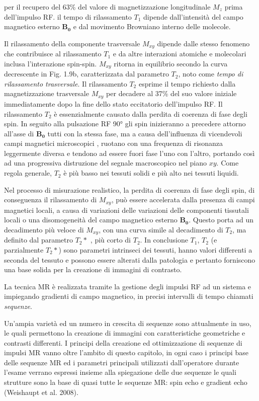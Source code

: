 \documentclass[leqno,10pt,twocolumn,a4paper]{article}
\begin{document}
	per il recupero del 63\% del valore di magnetizzazione longitudinale $M_z$ prima dell'impulso RF. il tempo di rilassamento $T_1$ dipende dall'intensità del campo magnetico esterno $\boldsymbol{B_0}$ e dal 
	movimento Browniano interno delle molecole. \par Il rilassamento della componente trasversale $M_{xy}$ dipende dalle stesso fenomeno che contribuisce al rilassamento $T_1$ e da altre interazioni atomiche e
	molecolari inclusa l'interazione spin-spin. $M_{xy}$ ritorna in equilibrio secondo la curva decrescente in Fig. 1.9b, caratterizzata dal parametro $T_2$, noto come \textit{tempo di rilassamento trasversale}.
	Il rilassamento $T_2$ esprime il tempo richiesto dalla magnetizzazione trasversale $M_{xy}$ per decadere al 37\% del suo valore iniziale immediatamente dopo la fine dello stato eccitatorio dell'impulso RF.
	Il rilassamento $T_2$ è essenzialmente causato dalla perdita di coerenza di fase degli spin. In seguito alla pulsazione RF 90° gli spin inizieranno a precedere attorno all'asse di $\boldsymbol{B_0}$ tutti con 
	la stessa fase, ma a causa dell'influenza di vicendevoli campi magnetici microscopici , ruotano con una frequenza di risonanza leggermente diversa e tendono ad essere fuori fase l'uno con l'altro, portando 
	così ad una progressiva distruzione del segnale macroscopico nel piano $xy$. Come regola generale, $T_2$ è più basso nei tessuti solidi e più alto nei tessuti liquidi. \par Nel processo di misurazione realistico,
	la perdita di coerenza di fase degli spin, di conseguenza il rilassamento di $M_{xy}$, può essere accelerata dalla presenza di campi magnetici locali, a causa di variazioni delle variazioni delle componenti tissutali
	locali o una disomogeneità del campo magnetico esterno $\boldsymbol{B_0}$. Questo porta ad un decadimento più veloce di $M_{xy}$, con una curva simile al decadimento di $T_2$, ma definito dal parametro
	$T_2*$%
	, più corto di $T_2$. In conclusione $T_1$, $T_2$ (e parzialmente $T_2*$) sono parametri intrinseci dei tessuti, hanno valori differenti a seconda del tessuto e possono essere alterati dalla patologia e pertanto
	forniscono una base solida per la creazione di immagini di contrasto. \par La tecnica MR è realizzata tramite la gestione degli impulsi RF ad un sistema e impiegando gradienti di campo magnetico, in precisi intervalli
	di tempo chiamati \textit{sequenze}. \par Un'ampia varietà ed un numero in crescita di sequenze sono attualmente in uso, le quali permettono la creazione di immagini con caratteristiche geometriche 
	e contrasti differenti. I principi della creazione ed ottimizzazione di sequenze di impulsi MR vanno oltre l'ambito di questo capitolo, %
	in ogni caso i principi base delle sequenze MR ed i parametri principali utilizzati dall'operatore durante l'esame verrano espressi insieme alla spiegazione delle due sequenze le quali strutture sono la base di quasi
	tutte le sequenze MR: spin echo e gradient echo (Weishaupt et al. 2008).
\end{document}
